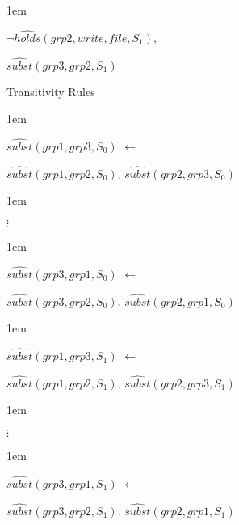 \documentclass[global,twocolumn,final]{svjour}
\newenvironment{vquote}
  {\begin{list}{}{\leftmargin 1em}\item[]}
  {\end{list}}
\begin{document}
\begin{enumerate}
\begin{vquote}
           \hspace{1em}
           $\lnot \hat{holds}(grp2, write, file, S_{1})$,

           \hspace{1em}
           $\hat{subst}(grp3, grp2, S_{1})$
         \end{vquote}

       \item
         Transitivity Rules

         \begin{vquote}
           $\hat{subst}(grp1, grp3, S_{0})$ $\leftarrow$

           \hspace{1em}
           $\hat{subst}(grp1, grp2, S_{0})$,
           $\hat{subst}(grp2, grp3, S_{0})$
         \end{vquote}

         \begin{vquote}
           \hspace{2em}$\vdots$
         \end{vquote}

         \begin{vquote}
           $\hat{subst}(grp3, grp1, S_{0})$ $\leftarrow$

           \hspace{1em}
           $\hat{subst}(grp3, grp2, S_{0})$,
           $\hat{subst}(grp2, grp1, S_{0})$
         \end{vquote}

         \begin{vquote}
           $\hat{subst}(grp1, grp3, S_{1})$ $\leftarrow$

           \hspace{1em}
           $\hat{subst}(grp1, grp2, S_{1})$,
           $\hat{subst}(grp2, grp3, S_{1})$
         \end{vquote}

         \begin{vquote}
           \hspace{2em}$\vdots$
         \end{vquote}

         \begin{vquote}
           $\hat{subst}(grp3, grp1, S_{1})$ $\leftarrow$

           \hspace{1em}
           $\hat{subst}(grp3, grp2, S_{1})$,
           $\hat{subst}(grp2, grp1, S_{1})$
         \end{vquote}


\end{enumerate}
\end{document}
